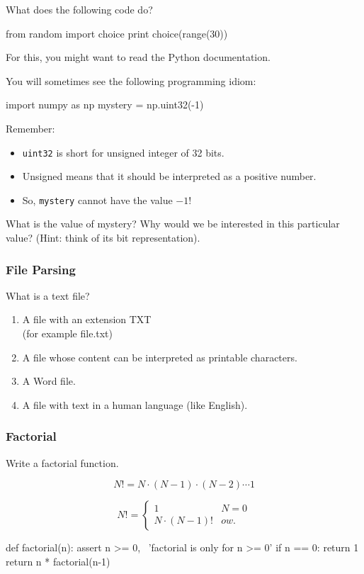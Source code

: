 \begin{frame}[fragile]
{}
What does the following code do?

\begin{python}
from random import choice
print choice(range(30))
\end{python}

For this, you might want to read the Python documentation.
\end{frame}

\begin{frame}[fragile]
{}
You will sometimes see the following programming idiom:

\begin{python}
import numpy as np
mystery = np.uint32(-1)
\end{python}

Remember:
\begin{itemize}
\item \lstinline{uint32} is short for \alert{unsigned integer of 32 bits}.
\item Unsigned means that it should be interpreted as a positive number.
\item So, \lstinline{mystery} cannot have the value $-1$!
\end{itemize}

What is the value of mystery? Why would we be interested in this particular
value? (Hint: think of its bit representation).

\end{frame}

\begin{frame}[fragile]
\frametitle{File Parsing}

What is a text file?

\begin{enumerate}
\item A file with an extension TXT\\
    (for example file.txt)
\item A file whose content can be interpreted as printable characters.
\item A Word file.
\item A file with text in a human language (like English).
\end{enumerate}
\end{frame}

\begin{frame}[fragile]
\frametitle{Factorial}
Write a factorial function.

\[
N! = N \cdot (N - 1) \cdot (N - 2) \cdots 1
\]

\pause

\[N! = \begin{cases}
        1 & N = 0 \\
        N\cdot (N-1)! & ow.
     \end{cases}
\]

\pause

\begin{python}
def factorial(n):
    assert n >= 0, \
        'factorial is only for n >= 0'
    if n == 0: return 1
    return n * factorial(n-1)
\end{python}

\end{frame}

